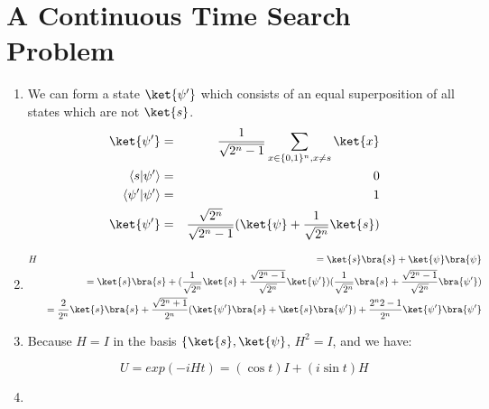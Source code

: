 \documentclass[12pt]{article}
\begin{document}
\pagebreak

\section{A Continuous Time Search Problem}

\begin{enumerate}
\item %
We can form a state $\ket{\psi'}$ which consists of an equal superposition of
all states which are not $\ket{s}$.
\begin{eqnarray*}
\displaystyle
\ket{\psi'} & = & \frac{1}{\sqrt{2^n-1}}\sum_{x \in \{0,1\}^n, x \ne s}\ket{x}\\
\braket{s}{\psi'} & = & 0\\
\braket{\psi'}{\psi'} & = & 1\\
\ket{\psi'} & = & \frac{\sqrt{2^n}}{\sqrt{2^n-1}}(\ket{\psi} + \frac{1}{\sqrt{2^n}}\ket{s})
\end{eqnarray*}

\item %
\begin{eqnarray*}
& H & = \ket{s}\bra{s} + \ket{\psi}\bra{\psi}\\
&   & = \ket{s}\bra{s} + (\frac{1}{\sqrt{2^n}}\ket{s} + \frac{\sqrt{2^n-1}}{\sqrt{2^n}}\ket{\psi'})(\frac{1}{\sqrt{2^n}}\bra{s} + \frac{\sqrt{2^n-1}}{\sqrt{2^n}}\bra{\psi'})\\
&   & = \frac{2}{2^n}\ket{s}\bra{s} + \frac{\sqrt{2^n+1}}{2^n}(\ket{\psi'}\bra{s} + \ket{s}\bra{\psi'}) + \frac{2^n 2-1}{2^n}\ket{\psi'}\bra{\psi'}
\end{eqnarray*}
\item %
Because $H = I$ in the basis $\{\ket{s},\ket{\psi}$, $H^2 = I$, and
we have:

\begin{displaymath}
U = exp(-iHt) = (\cos{t})I + (i\sin{t})H
\end{displaymath}

\item %

\end{enumerate}
\end{document}
